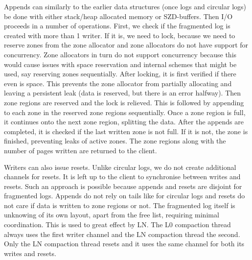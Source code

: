 Appends can similarly to the earlier data structures (once logs and circular logs) be done with either stack/heap allocated memory or SZD-buffers. Then I/O proceeds in a number of operations. First, we check if the fragmented log is created with more than 1 writer. If it is, we need to lock, because we need to reserve zones from the zone allocator and zone allocators do not have support for concurrency. Zone allocators in turn do not support concurrency because this would cause issues with space reservation and internal schemes that might be used, say reserving zones sequentially. After locking, it is first verified if there even is space. This prevents the zone allocator from partially allocating and leaving a persistent leak (data is reserved, but there is an error halfway). Then zone regions are reserved and the lock is relieved. This is followed by appending to each zone in the reserved zone regions sequentially. Once a zone region is full, it continues onto the next zone region, splitting the data. After the appends are completed, it is checked if the last written zone is not full. If it is not, the zone is finished, preventing leaks of active zones. The zone regions along with the number of pages written are returned to the client.

Writers can also issue resets. Unlike circular logs, we do not create additional channels for resets. It is left up to the client to synchronise between writes and resets. Such an approach is possible because appends and resets are disjoint for fragmented logs. Appends do not rely on tails like for circular logs and resets do not care if data is written to zone regions or not. The fragmented log itself is unknowing of its own layout, apart from the free list, requiring minimal coordination.  This is used to great effect by LN. The L0 compaction thread always uses the first writer channel and the LN compaction thread the second. Only the LN compaction thread resets and it uses the same channel for both its writes and resets.

